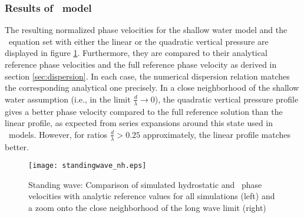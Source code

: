 \subsubsection{Results of \nh\ model}
The resulting normalized phase velocities for the shallow water model and the \nh\ equation set with either the linear or the quadratic vertical pressure are displayed in figure \ref{fig:nh_standingwave}. Furthermore, they are compared to their analytical reference phase velocities and the full reference phase velocity as derived in section \ref{sec:dispersion}. 
In each case, the numerical dispersion relation matches the corresponding analytical one precisely.
In a close neighborhood of the shallow water assumption (i.e., in the limit $\frac{d}{\lambda} \rightarrow 0$), the quadratic vertical pressure profile gives a better phase velocity compared to the full reference solution than the linear profile, as expected from series expansions around this state used in \Bt\ models.
However, for ratios $\frac{d}{\lambda} > 0.25$ approximately, the linear profile matches better.

\begin{figure}[htbp]
        \texttt{[image: standingwave\_nh.eps]}
        \caption{Standing wave: Comparison of simulated hydrostatic and \nh\ phase velocities with analytic reference values for all simulations (left) and a zoom onto the close neighborhood of the long wave limit (right)}
        \label{fig:nh_standingwave}
\end{figure}

